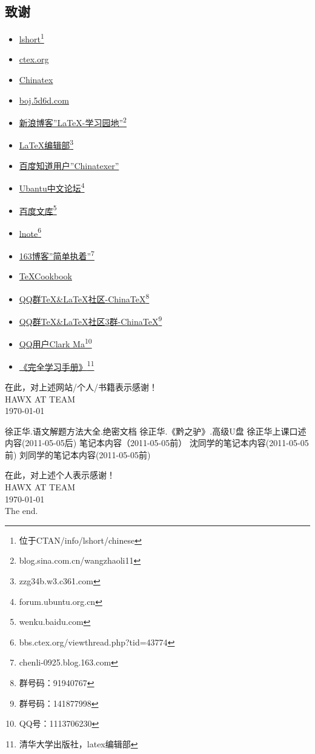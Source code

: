 \subsection{致谢}\label{thanks}
\begin{itemize}
\item \underline{lshort}\footnote{位于CTAN/info/lshort/chinese}
\item \underline{ctex.org}
\item \underline{Chinatex}
\item \underline{boj.5d6d.com}
\item \underline{新浪博客''LaTeX-学习园地''}\footnote{blog.sina.com.cn/wangzhaoli11}
\item \underline{LaTeX编辑部}\footnote{zzg34b.w3.c361.com}
\item \underline{百度知道用户''Chinatexer''}
\item \underline{Ubantu中文论坛}\footnote{forum.ubuntu.org.cn}
\item \underline{百度文库}\footnote{wenku.baidu.com}
\item \underline{lnote}\footnote{bbs.ctex.org/viewthread.php?tid=43774}
\item \underline{163博客''简单执着''}\footnote{chenli-0925.blog.163.com}
\item \underline{\TeX Cookbook}
\item \underline{QQ群TeX\&LaTeX社区-ChinaTeX}\footnote{群号码：91940767}
\item \underline{QQ群TeX\&LaTeX社区3群-ChinaTeX}\footnote{群号码：141877998}
\item \underline{QQ用户Clark Ma}\footnote{QQ号：1113706230}
\item \underline{《\LaTeXe 完全学习手册》}\footnote{清华大学出版社，latex编辑部}
\end{itemize}
在此，对上述网站/个人/书籍表示感谢！\\
HAWX AT TEAM\\
\today\\ %
\newpage
\begin{thebibliography}{99}
徐正华.语文解题方法大全.绝密文档
徐正华.《黔之驴》.高级U盘
徐正华上课口述内容(2011-05-05后)
笔记本内容（2011-05-05前）
沈同学的笔记本内容(2011-05-05前)
刘同学的笔记本内容(2011-05-05前)
\end{thebibliography}
在此，对上述个人表示感谢！\\
HAWX AT TEAM\\
\today\\
The end. 